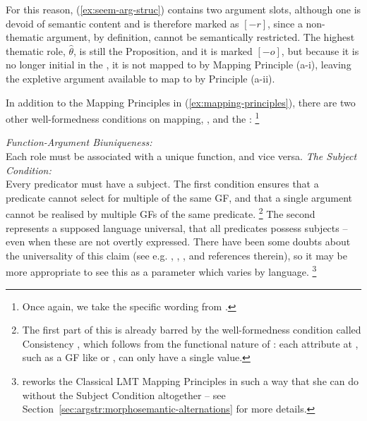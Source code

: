 \documentclass[output=paper]{langscibook}
\begin{document}
\ea
{}\label{ex:bad-seem}
\label{ex:good-seem-it}
\z
\z
%
For this reason, (\ref{ex:seem-arg-struc}) contains two argument slots, although
one is devoid of semantic content and is therefore marked as $[-r]$, since a
non-thematic argument, by definition, cannot be semantically restricted. The
highest thematic role, $\hat\theta$, is still the Proposition, and it is marked
$[-o]$, but because it is no longer initial in the \astruc, it is not mapped to
\SUBJ by Mapping Principle (a-i), leaving the expletive argument available to
map to \SUBJ by Principle (a-ii).

In addition to the Mapping Principles in (\ref{ex:mapping-principles}), there
are two other well-formed\-ness conditions on mapping,  \citep[112]{bresnan:polyadicity}, and the  \citep[28]{baker83,bresnan1989locative}:%
%
\footnote{Once again, we take the specific wording from
  \citet[334]{BresnanEtAl2016}.}
%

\ea
\textit{Function-Argument Biuniqueness:}\\
Each \astruc{} role must be associated with a unique function, and vice versa.
\ex
\textit{The Subject Condition:}\\
Every predicator must have a subject.%
\z
%
The first condition ensures that a predicate cannot select for multiple of the
same GF, and that a single argument cannot be realised by multiple GFs of the
same predicate.%
%
\footnote{The first part of this is already barred by the \fstruc{}
  well-formedness condition called Consistency \citep[53--54]{DLM:LFG}, which
  follows from the functional nature of \fstruc: each attribute at \fstruc, such
  as a GF like \SUBJ or \OBJ, can only have a single value.\label{fn:consistency}}
%
The second represents a supposed language universal, that all predicates possess
subjects -- even when these are not overtly expressed. There have been some
doubts about the universality of this claim (see e.g. \citealt[28,
fn.~37]{bresnan1989locative}, \citealt[334, fn.~9]{BresnanEtAl2016},
\citealt{Kibort2006}, and references therein), so it may be more appropriate to
see this as a parameter which varies by language.%
%
\footnote{\citet[358--359]{Kibort2004} reworks the Classical LMT Mapping
  Principles in such a way that she can do without the Subject Condition
  altogether -- see Section~\ref{sec:argstr:morphosemantic-alternations} for more
  details.}
%
\end{document}
